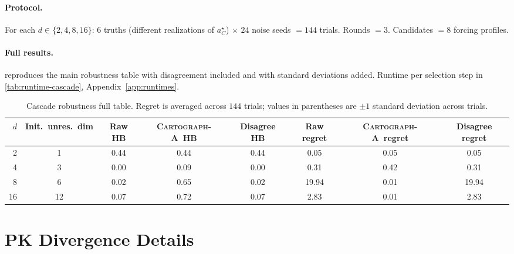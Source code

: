 \documentclass{article}
\newcommand{\uopt}{\textsc{Cartograph-A}}
\theoremstyle{plain}
\theoremstyle{definition}
\theoremstyle{remark}
\begin{document}
\paragraph{Protocol.}
For each $d\in\{2,4,8,16\}$: $6$ truths (different realizations of
$a^{\star}_C$) $\times$ $24$ noise seeds $=144$ trials. Rounds $=3$.
Candidates $=8$ forcing profiles.

\paragraph{Full results.}
 reproduces the main robustness table with
disagreement included and with standard deviations added. Runtime per
selection step in \cref{tab:runtime-cascade}, Appendix~\ref{app:runtimes}.

\begin{table}[t]
\caption{Cascade robustness full table. Regret is averaged across
$144$ trials; values in parentheses are $\pm 1$ standard deviation across
trials.}
\label{tab:cascade-full}
\centering
\small
\begin{tabular}{r c c c c c c c}
\toprule
$d$ & Init.~unres.~dim & Raw HB & \uopt\ HB & Disagree HB & Raw regret & \uopt\ regret & Disagree regret \\
\midrule
2  & 1  & 0.44 & 0.44 & 0.44 & 0.05 & 0.05 & 0.05 \\
4  & 3  & 0.00 & 0.09 & 0.00 & 0.31 & 0.42 & 0.31 \\
8  & 6  & 0.02 & 0.65 & 0.02 & 19.94 & 0.01 & 19.94 \\
16 & 12 & 0.07 & 0.72 & 0.07 &  2.83 & 0.01 &  2.83 \\
\bottomrule
\end{tabular}
\end{table}

\section{PK Divergence Details}
\label{app:pk-detail}
\end{document}
